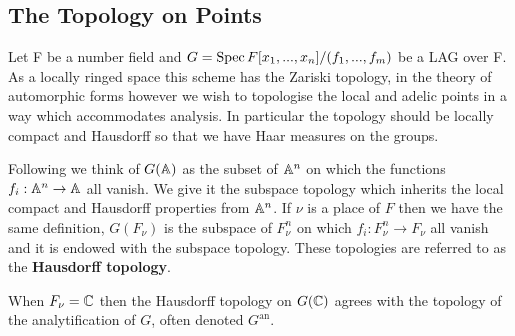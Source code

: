     \subsection{The Topology on Points}\label{topology}
	Let F be a number field and \(G = \operatorname{Spec} F[x_1, ..., x_n]/(f_1, ..., f_m)\) be a LAG over F. As a locally ringed space this scheme has the Zariski topology, in the theory of automorphic forms however we wish to topologise the local and adelic points in a way which accommodates analysis. In particular the topology should be locally compact and Hausdorff so that we have Haar measures on the groups. 
	
	Following \cite{conradWeilGrothendieckApproaches2012} we think of \(G(\A)\) as the subset of \(\A^n\) on which the functions \(f_i: \A^n \to \A\) all vanish. We give it the subspace topology which inherits the local compact and Hausdorff properties from \(\A^n\). If \(\nu\) is a place of \(F\) then we have the same definition, \(G(F_\nu)\) is the subspace of \(F_\nu^n\) on which \(f_i:F_\nu^n \to F_\nu\) all vanish and it is endowed with the subspace topology.
	These topologies are referred to as the \textbf{Hausdorff topology}.
	
	\begin{remark}
		When \(F_\nu = \C\) then the Hausdorff topology on \(G(\C)\) agrees with the topology of the analytification of \(G\), often denoted \(G^{\mathrm{an}}\).
	\end{remark}

